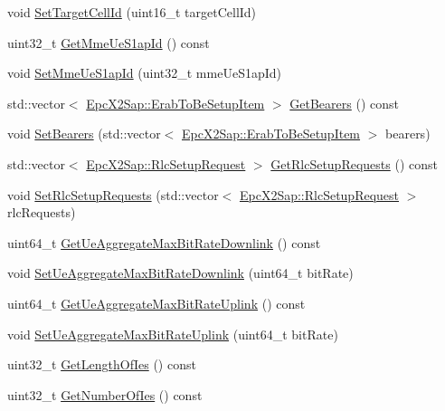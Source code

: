 \begin{DoxyCompactItemize}
\item 
void \hyperlink{classns3_1_1EpcX2HandoverRequestHeader_a33d64e50e2de62af55ff9116623fd057}{Set\+Target\+Cell\+Id} (uint16\+\_\+t target\+Cell\+Id)
\item 
uint32\+\_\+t \hyperlink{classns3_1_1EpcX2HandoverRequestHeader_aeae364e094094d6758abe71b946c15b3}{Get\+Mme\+Ue\+S1ap\+Id} () const 
\item 
void \hyperlink{classns3_1_1EpcX2HandoverRequestHeader_a23fe3848b47c7d49f8dc85a79ca1dff1}{Set\+Mme\+Ue\+S1ap\+Id} (uint32\+\_\+t mme\+Ue\+S1ap\+Id)
\item 
std\+::vector$<$ \hyperlink{structns3_1_1EpcX2Sap_1_1ErabToBeSetupItem}{Epc\+X2\+Sap\+::\+Erab\+To\+Be\+Setup\+Item} $>$ \hyperlink{classns3_1_1EpcX2HandoverRequestHeader_ae9c04127e558b47cec9219616d0354d5}{Get\+Bearers} () const 
\item 
void \hyperlink{classns3_1_1EpcX2HandoverRequestHeader_a6d77ef1dcc5925a0f85728d2b2f909bc}{Set\+Bearers} (std\+::vector$<$ \hyperlink{structns3_1_1EpcX2Sap_1_1ErabToBeSetupItem}{Epc\+X2\+Sap\+::\+Erab\+To\+Be\+Setup\+Item} $>$ bearers)
\item 
std\+::vector$<$ \hyperlink{structns3_1_1EpcX2Sap_1_1RlcSetupRequest}{Epc\+X2\+Sap\+::\+Rlc\+Setup\+Request} $>$ \hyperlink{classns3_1_1EpcX2HandoverRequestHeader_aab312be16ca4b5eea1ea2c30b96efe0f}{Get\+Rlc\+Setup\+Requests} () const 
\item 
void \hyperlink{classns3_1_1EpcX2HandoverRequestHeader_acc86cadeae5c90c79e2208ef7cab8c2a}{Set\+Rlc\+Setup\+Requests} (std\+::vector$<$ \hyperlink{structns3_1_1EpcX2Sap_1_1RlcSetupRequest}{Epc\+X2\+Sap\+::\+Rlc\+Setup\+Request} $>$ rlc\+Requests)
\item 
uint64\+\_\+t \hyperlink{classns3_1_1EpcX2HandoverRequestHeader_a6391d30190de6de50167e2e14cb2be84}{Get\+Ue\+Aggregate\+Max\+Bit\+Rate\+Downlink} () const 
\item 
void \hyperlink{classns3_1_1EpcX2HandoverRequestHeader_a7745d92544a9a32dca07ee67d38b1707}{Set\+Ue\+Aggregate\+Max\+Bit\+Rate\+Downlink} (uint64\+\_\+t bit\+Rate)
\item 
uint64\+\_\+t \hyperlink{classns3_1_1EpcX2HandoverRequestHeader_ace60aabba4aedae4d27f876c69fccaf3}{Get\+Ue\+Aggregate\+Max\+Bit\+Rate\+Uplink} () const 
\item 
void \hyperlink{classns3_1_1EpcX2HandoverRequestHeader_a51f01184d510a74be003d3eea7768303}{Set\+Ue\+Aggregate\+Max\+Bit\+Rate\+Uplink} (uint64\+\_\+t bit\+Rate)
\item 
uint32\+\_\+t \hyperlink{classns3_1_1EpcX2HandoverRequestHeader_a377cf49b5af9ded954bd69505ae8e8b1}{Get\+Length\+Of\+Ies} () const 
\item 
uint32\+\_\+t \hyperlink{classns3_1_1EpcX2HandoverRequestHeader_a306ab916604f95e090975c36ddf1b2a8}{Get\+Number\+Of\+Ies} () const 
\end{DoxyCompactItemize}

